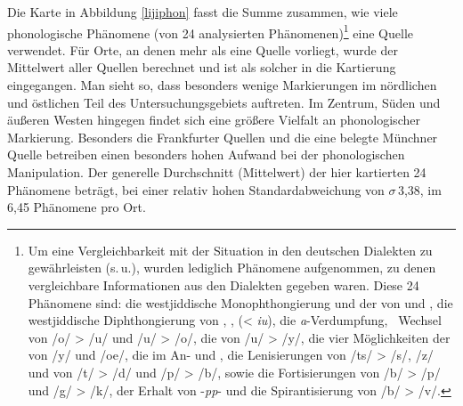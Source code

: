 { 
  Die Karte in Abbildung \ref{lijiphon} fasst die Summe zusammen, wie viele phonologische Phänomene (von 24 analysierten Phänomenen)\footnote{Um eine Vergleichbarkeit mit der Situation in den deutschen Dialekten zu gewährleisten (s.\,u.), wurden lediglich Phänomene aufgenommen, zu denen vergleichbare Informationen aus den Dialekten gegeben waren. Diese 24 Phänomene sind: die westjiddische Monophthongierung und der  von  und , die westjiddische Diphthongierung von , ,  (< {\mhd} \textit{iu}), die \textit{a}-Verdumpfung, \,%
 Wechsel von /o/ > /u/ und /u/ > /o/, die  von /u/ > /y/, die vier Möglichkeiten der  von /y/ und /oe/, die  im An- und , die Lenisierungen von /ts/ > /s/, /z/ und von /t/ > /d/ und /p/ > /b/, sowie die Fortisierungen von /b/ > /p/ und /g/ > /k/, der Erhalt von {\westgerm} -\textit{pp}- und die Spirantisierung von /b/ > /v/.} eine Quelle verwendet. Für Orte, an denen mehr als eine Quelle vorliegt, wurde der Mittelwert aller Quellen berechnet und ist als solcher in die Kartierung eingegangen. Man sieht so, dass besonders wenige Markierungen im nördlichen und östlichen Teil des Untersuchungsgebiets auftreten. Im Zentrum, Süden und äußeren Westen hingegen findet sich eine größere Vielfalt an phonologischer Markierung. Besonders die Frankfurter Quellen und die eine belegte Münchner Quelle betreiben einen besonders hohen Aufwand bei der phonologischen Manipulation. Der generelle Durchschnitt (Mittelwert) der hier kartierten 24 Phänomene beträgt, bei einer relativ hohen Standardabweichung von {$\sigma$}\,3,38, im  6,45 Phänomene pro Ort.


}
